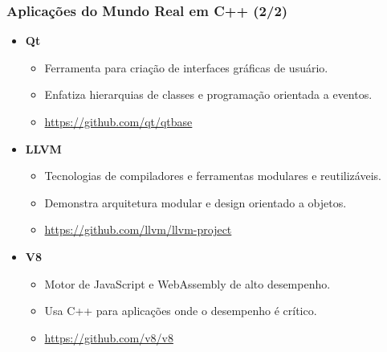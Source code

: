 \documentclass[aspectratio=169]{beamer}
\begin{document}
\begin{frame}

\frametitle{Aplicações do Mundo Real em C++ (2/2)}

    \begin{itemize}
        \item \textbf{Qt}
        \begin{itemize}
            \item Ferramenta para criação de interfaces gráficas de usuário.
            \item Enfatiza hierarquias de classes e programação orientada a eventos.
            \item \href{https://github.com/qt/qtbase}{https://github.com/qt/qtbase}
        \end{itemize}

        \item \textbf{LLVM}
        \begin{itemize}
            \item Tecnologias de compiladores e ferramentas modulares e reutilizáveis.
            \item Demonstra arquitetura modular e design orientado a objetos.
            \item \href{https://github.com/llvm/llvm-project}{https://github.com/llvm/llvm-project}
        \end{itemize}

        \item \textbf{V8}
        \begin{itemize}
            \item Motor de JavaScript e WebAssembly de alto desempenho.
            \item Usa C++ para aplicações onde o desempenho é crítico.
            \item \href{https://github.com/v8/v8}{https://github.com/v8/v8}
        \end{itemize}
    \end{itemize}
\end{frame}
\end{document}
